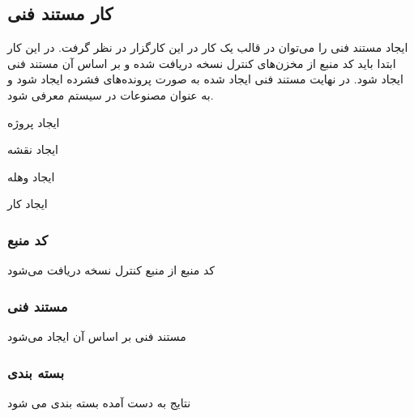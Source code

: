     
    
\subsection{کار مستند فنی}

ایجاد مستند فنی را می‌توان در قالب یک کار در این کارگزار در نظر گرفت. در این کار
ابتدا باید کد منبع از مخزن‌های کنترل نسخه دریافت شده و بر اساس آن مستند فنی
ایجاد شود. در نهایت مستند فنی ایجاد شده به صورت پرونده‌های فشرده ایجاد شود و به
عنوان مصنوعات در سیستم معرفی شود.


ایجاد پروژه

ایجاد نقشه

ایجاد وهله

ایجاد کار 



\subsubsection{کد منبع}

کد منبع از منبع کنترل نسخه دریافت می‌شود

\subsubsection{مستند فنی}

مستند فنی بر اساس آن ایجاد  می‌شود

\subsubsection{بسته بندی}

نتایج به دست آمده بسته بندی می شود